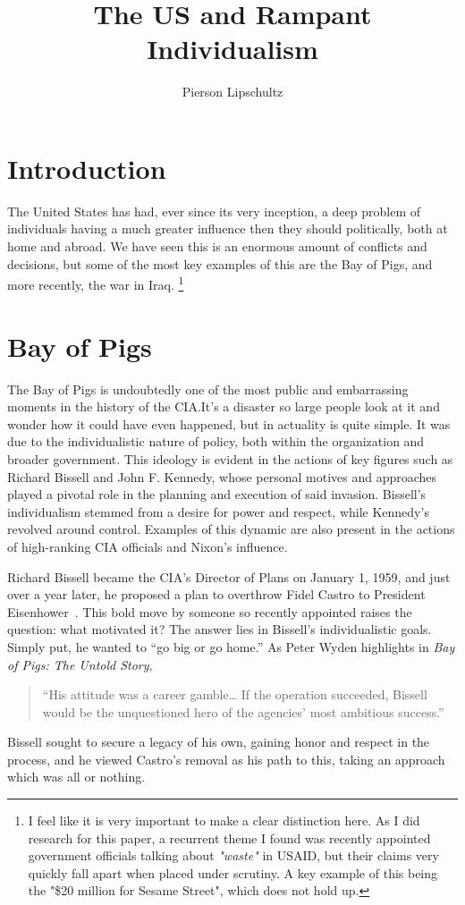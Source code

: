 \documentclass{article}
\title{The US and Rampant Individualism }
\author{Pierson Lipschultz}
\begin{document}
\maketitle



\section{Introduction}
    The United States has had, ever since its very inception, a deep problem of individuals having a much greater influence then they should politically, both at home and abroad. We have seen this is an enormous amount of conflicts and decisions, but some of the most key examples of this are the Bay of Pigs, and more recently, the war in Iraq. \footnote{I feel like it is very important to make a clear distinction here. As I did research for this paper, a recurrent  theme I found was recently appointed government officials talking about \textit{"waste"} in USAID, but their claims very quickly fall apart when placed under scrutiny. A key example of this being the "\$20 million for Sesame Street", which does not hold up.}

\section{Bay of Pigs}

    The Bay of Pigs is undoubtedly one of the most public and embarrassing moments in the history of the CIA.\@ It's a disaster so large people look at it and wonder how it could have even happened, but in actuality is quite simple. It was due to the individualistic nature of policy, both within the organization and broader government. This ideology is evident in the actions of key figures such as Richard Bissell and John F. Kennedy, whose personal motives and approaches played a pivotal role in the planning and execution of said invasion. Bissell's individualism stemmed from a desire for power and respect, while Kennedy's revolved around control. Examples of this dynamic are also present in the actions of high-ranking CIA officials and Nixon's influence.~\cite{JeffreysJones2003}

    Richard Bissell became the CIA's Director of Plans on January 1, 1959, and just over a year later, he proposed a plan to overthrow Fidel Castro to President Eisenhower~\cite{Wyden1979}. This bold move by someone so recently appointed raises the question: what motivated it? The answer lies in Bissell's individualistic goals. Simply put, he wanted to “go big or go home.” As Peter Wyden highlights in \textit{Bay of Pigs: The Untold Story}, 
    \begin{quotation}
        “His attitude was a career gamble… If the operation succeeded, Bissell would be the unquestioned hero of the agencies' most ambitious success.”
    \end{quotation} 
    Bissell sought to secure a legacy of his own, gaining honor and respect in the process, and he viewed Castro's removal as his path to this, taking an approach which was all or nothing.
\end{document}
